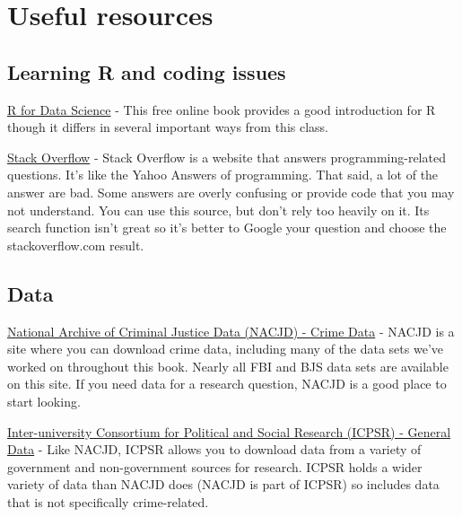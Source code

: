\documentclass[
  12pt,
]{book}
\begin{document}
\cleardoublepage

\hypertarget{appendix-appendix}{%
\appendix {}}


\hypertarget{useful-resources}{%
\chapter{Useful resources}\label{useful-resources}}

\hypertarget{learning-r-and-coding-issues}{%
\section{Learning R and coding issues}\label{learning-r-and-coding-issues}}

\href{http://r4ds.had.co.nz/}{R for Data Science} - This free online book provides a good introduction for R though it differs in several important ways from this class.

\href{http://stackoverflow.com/}{Stack Overflow} - Stack Overflow is a website that answers programming-related questions. It's like the Yahoo Answers of programming. That said, a lot of the answer are bad. Some answers are overly confusing or provide code that you may not understand. You can use this source, but don't rely too heavily on it. Its search function isn't great so it's better to Google your question and choose the stackoverflow.com result.

\hypertarget{data}{%
\section{Data}\label{data}}

\href{https://www.icpsr.umich.edu/icpsrweb/content/NACJD/index.html}{National Archive of Criminal Justice Data (NACJD) - Crime Data} - NACJD is a site where you can download crime data, including many of the data sets we've worked on throughout this book. Nearly all FBI and BJS data sets are available on this site. If you need data for a research question, NACJD is a good place to start looking.

\href{https://www.icpsr.umich.edu/icpsrweb/}{Inter-university Consortium for Political and Social Research (ICPSR) - General Data} - Like NACJD, ICPSR allows you to download data from a variety of government and non-government sources for research. ICPSR holds a wider variety of data than NACJD does (NACJD is part of ICPSR) so includes data that is not specifically crime-related.
\end{document}
